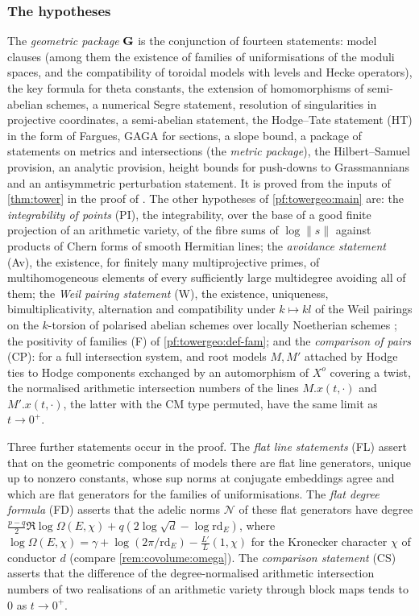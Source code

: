 \subsubsection*{The hypotheses}
The \emph{geometric package} $\mathbf G$ is the conjunction of fourteen statements: model clauses (among
them the existence of families of uniformisations of the moduli spaces, and the compatibility of toroidal
models with levels and Hecke operators), the key formula for theta constants, the extension of
homomorphisms of semi-abelian schemes, a numerical Segre statement, resolution of singularities in
projective coordinates, a semi-abelian statement, the Hodge--Tate statement \textup{(HT)} in the form of
Fargues, GAGA for sections, a slope bound, a package of statements on metrics and intersections (the
\emph{metric package}), the Hilbert--Samuel provision, an analytic provision, height bounds for
push-downs to Grassmannians and an antisymmetric perturbation statement. It is proved from the inputs of
\cref{thm:tower} in the proof of . The other
hypotheses of \cref{pf:towergeo:main} are: the \emph{integrability of points} (PI), the integrability, over
the base of a good finite projection of an arithmetic variety, of the fibre sums of $\log\|s\|$ against
products of Chern forms of smooth Hermitian lines; the \emph{avoidance statement} (Av), the existence, for
finitely many multiprojective primes, of multihomogeneous elements of every sufficiently large multidegree
avoiding all of them; the \emph{Weil pairing statement} (W), the existence, uniqueness,
bimultiplicativity, alternation and compatibility under $k\mapsto kl$ of the Weil pairings on the
$k$-torsion of polarised abelian schemes over locally Noetherian schemes \cite{Mumford1970}; the
positivity of families (F) of \cref{pf:towergeo:def-fam}; and the \emph{comparison of pairs} (CP): for a
full intersection system, and root models $M,M'$ attached by Hodge ties to Hodge components exchanged by
an automorphism of $X^o$ covering a twist, the normalised arithmetic intersection numbers of the lines
$M.x(t,\cdot)$ and $M'.x(t,\cdot)$, the latter with the CM type permuted, have the same limit as
$t\to0^+$.

Three further statements occur in the proof. The \emph{flat line statements} (FL) assert that on the
geometric components of models there are flat line generators, unique up to nonzero constants, whose sup
norms at conjugate embeddings agree and which are flat generators for the families of uniformisations.
The \emph{flat degree formula} (FD) asserts that the adelic norms $\mathcal N$ of these flat generators
have degree $\frac{p-q}2\Re\log\Omega(E,\chi)+q(2\log\sqrt d-\log\mathrm{rd}_E)$, where
$\log\Omega(E,\chi)=\gamma+\log(2\pi/\mathrm{rd}_E)-\frac{L'}{L}(1,\chi)$ for the Kronecker character
$\chi$ of conductor $d$ (compare \cref{rem:covolume:omega}). The \emph{comparison statement} (CS) asserts
that the difference of the degree-normalised arithmetic intersection numbers of two realisations of an
arithmetic variety through block maps tends to $0$ as $t\to0^+$.

